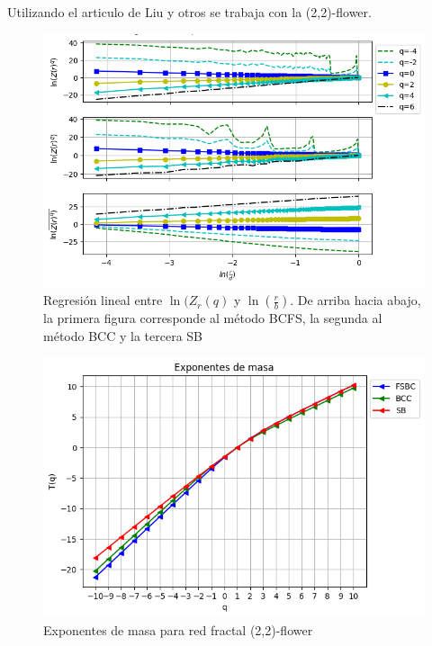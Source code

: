Utilizando el articulo de Liu y otros\cite{Liu2015} se trabaja con la (2,2)-flower.

\begin{figure}[H]
    \centering
    \includegraphics[scale=0.7]{Capitulo4Multifractalidad/imagenes/a_TqLnrBCflower22.png}
    \caption{Regresión lineal entre $\ln(Z_r(q)$ y $\ln(\frac{r}{b})$. De arriba hacia abajo, la primera figura corresponde al método BCFS, la segunda al método BCC y la tercera SB}
\end{figure}

\begin{figure}[H]
    \centering
    \includegraphics[scale=0.7]{Capitulo4Multifractalidad/imagenes/a_Tqflower22.png}
    \caption{Exponentes de masa para red fractal (2,2)-flower}
\end{figure}

